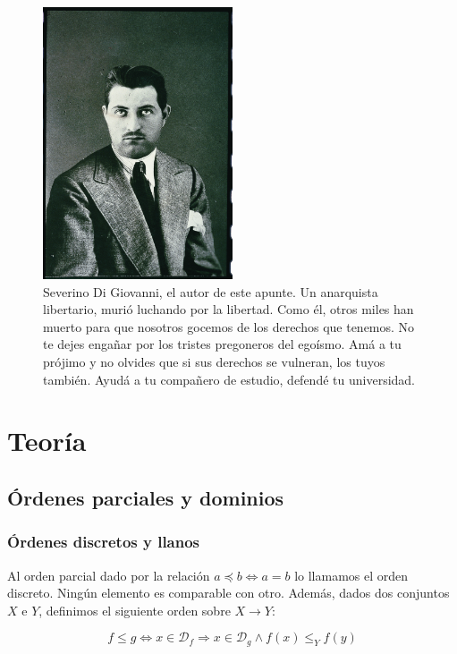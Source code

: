 \documentclass[a4paper, 12pt]{article}
\begin{document}
 \begin{figure}[h!]
 \centering
  \includegraphics[width=0.5\textwidth]{../Images/SeverinoDiGiovanni.jpg}
 \caption{Severino Di Giovanni, el autor de este apunte. Un anarquista
   libertario, murió luchando por la libertad. Como él, otros miles han muerto
   para que nosotros gocemos de los derechos que tenemos. No te dejes engañar
   por los tristes pregoneros del egoísmo. Amá a tu prójimo y no olvides que si
   sus derechos se vulneran, los tuyos también. Ayudá a tu compañero de estudio,
 defendé tu universidad. }
 \end{figure}

\pagebreak
\tableofcontents
\newpage

\section{Teoría}

\subsection{Órdenes parciales y dominios}

\subsubsection{Órdenes discretos y llanos}

Al orden parcial dado por la relación $a \preceq b \iff a = b$ lo llamamos el
orden discreto. Ningún elemento es comparable con otro. Además, dados dos
conjuntos $X$ e $Y$, definimos el
siguiente orden sobre $X \to Y$:

\begin{equation*}
  f \leq g \iff x \in \mathcal{D}_f \Rightarrow x \in \mathcal{D}_g \land
  f(x) \leq_Y f(y)
\end{equation*}
\end{document}
